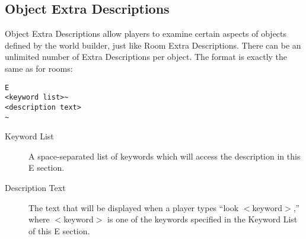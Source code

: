 \documentclass[11pt]{article}
\begin{document}
\subsection{Object Extra Descriptions}
Object Extra Descriptions allow players to examine certain aspects of objects defined by the world builder, just like Room Extra Descriptions.  There can be an unlimited number of Extra Descriptions per object.  The format is exactly the same as for rooms:
\begin{verbatim}
E
<keyword list>~
<description text>
~
\end{verbatim}
\begin{description}
\item[Keyword List] A space-separated list of keywords which will access the description in this E section.
\item[Description Text] The text that will be displayed when a player types ``look $<$keyword$>$,'' where $<$keyword$>$ is one of the keywords specified in the Keyword List of this E section.
\end{description}
\end{document}

